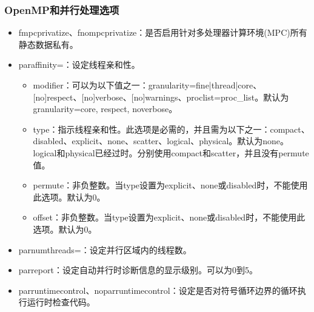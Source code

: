 \documentclass[a4paper,12pt,english]{sphinxmanual}
\begin{document}
\subsubsection{OpenMP和并行处理选项}
\label{\detokenize{compiler/intel:openmp}}\begin{itemize}
\item {} 
\sphinxAtStartPar
\sphinxhyphen{}fmpc\sphinxhyphen{}privatize、\sphinxhyphen{}fno\sphinxhyphen{}mpc\sphinxhyphen{}privatize：是否启用针对多处理器计算环境(MPC)所有静态数据私有。

\item {} 
\sphinxAtStartPar
\sphinxhyphen{}par\sphinxhyphen{}affinity=：设定线程亲和性。
\begin{itemize}
\item {} 
\sphinxAtStartPar
modifier：可以为以下值之一：granularity=fine|thread|core、{[}no{]}respect、{[}no{]}verbose、{[}no{]}warnings、proclist=proc\_list。默认为granularity=core, respect, noverbose。

\item {} 
\sphinxAtStartPar
type：指示线程亲和性。此选项是必需的，并且需为以下之一：compact、disabled、explicit、none、scatter、logical、physical。默认为none。logical和physical已经过时。分别使用compact和scatter，并且没有permute值。

\item {} 
\sphinxAtStartPar
permute：非负整数。当type设置为explicit、none或disabled时，不能使用此选项。默认为0。

\item {} 
\sphinxAtStartPar
offset：非负整数。当type设置为explicit、none或disabled时，不能使用此选项。默认为0。

\end{itemize}

\item {} 
\sphinxAtStartPar
\sphinxhyphen{}par\sphinxhyphen{}num\sphinxhyphen{}threads=：设定并行区域内的线程数。

\item {} 
\sphinxAtStartPar
\sphinxhyphen{}par\sphinxhyphen{}report：设定自动并行时诊断信息的显示级别。可以为0到5。

\item {} 
\sphinxAtStartPar
\sphinxhyphen{}par\sphinxhyphen{}runtime\sphinxhyphen{}control、\sphinxhyphen{}no\sphinxhyphen{}par\sphinxhyphen{}runtime\sphinxhyphen{}control：设定是否对符号循环边界的循环执行运行时检查代码。


\end{itemize}
\end{document}
